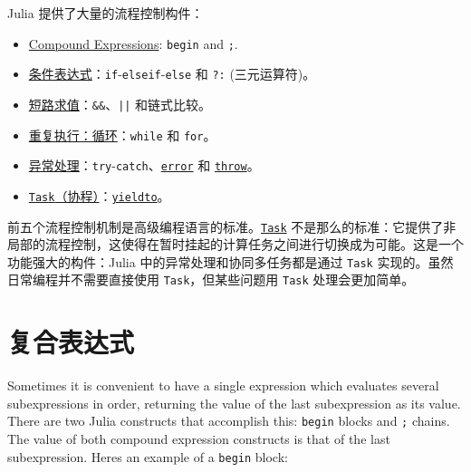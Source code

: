Julia 提供了大量的流程控制构件：



\begin{itemize}
\item \hyperlink{14178955634857450370}{Compound Expressions}: \texttt{begin} and \texttt{;}.


\item \hyperlink{14451148373001501733}{条件表达式}：\texttt{if}-\texttt{elseif}-\texttt{else} 和 \texttt{?:} (三元运算符)。


\item \hyperlink{7551496361738057869}{短路求值}：\texttt{\&\&}、\texttt{||} 和链式比较。


\item \hyperlink{9034109510149997190}{重复执行：循环}：\texttt{while} 和 \texttt{for}。


\item \hyperlink{17887694433469406627}{异常处理}：\texttt{try}-\texttt{catch}、\hyperlink{17992125292605951734}{\texttt{error}} 和 \hyperlink{16410366672587017456}{\texttt{throw}}。


\item \hyperlink{17473131347184639576}{\texttt{Task}（协程）}：\hyperlink{4920987536368477483}{\texttt{yieldto}}。

\end{itemize}


前五个流程控制机制是高级编程语言的标准。\hyperlink{7131243650304654155}{\texttt{Task}} 不是那么的标准：它提供了非局部的流程控制，这使得在暂时挂起的计算任务之间进行切换成为可能。这是一个功能强大的构件：Julia 中的异常处理和协同多任务都是通过 \texttt{Task} 实现的。虽然日常编程并不需要直接使用 \texttt{Task}，但某些问题用 \texttt{Task} 处理会更加简单。



\hypertarget{16096814372489430927}{}


\section{复合表达式}



Sometimes it is convenient to have a single expression which evaluates several subexpressions in order, returning the value of the last subexpression as its value. There are two Julia constructs that accomplish this: \texttt{begin} blocks and \texttt{;} chains. The value of both compound expression constructs is that of the last subexpression. Here{\textquotesingle}s an example of a \texttt{begin} block:





